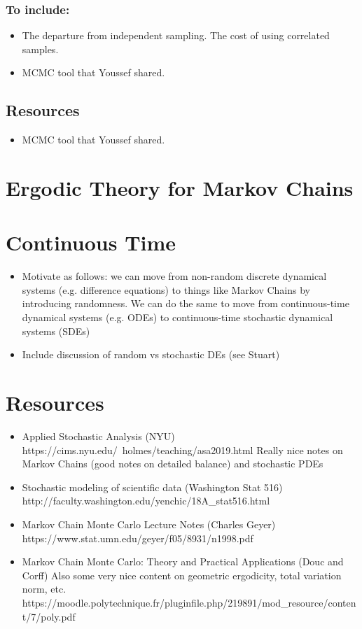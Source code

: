 \documentclass[12pt]{article}
\begin{document}
\subsubsection{To include:}
\begin{itemize}
\item The departure from independent sampling. The cost of using correlated samples. 
\item MCMC tool that Youssef shared. 
\end{itemize}

\subsection{Resources}
\begin{itemize}
\item MCMC tool that Youssef shared. 
\end{itemize}

\section{Ergodic Theory for Markov Chains}


\section{Continuous Time}
\begin{itemize}
\item Motivate as follows: we can move from non-random discrete dynamical systems (e.g. difference equations) to things like Markov Chains by introducing randomness. We can do the 
same to move from continuous-time dynamical systems (e.g. ODEs) to continuous-time stochastic dynamical systems (SDEs) 
\item Include discussion of random vs stochastic DEs (see Stuart)
\end{itemize}

\section{Resources}
\begin{itemize}
\item Applied Stochastic Analysis (NYU)
https://cims.nyu.edu/~holmes/teaching/asa2019.html
Really nice notes on Markov Chains (good notes on detailed balance) and stochastic PDEs
\item Stochastic modeling of scientific data (Washington Stat 516)
http://faculty.washington.edu/yenchic/18A_stat516.html
\item Markov Chain Monte Carlo Lecture Notes (Charles Geyer)
https://www.stat.umn.edu/geyer/f05/8931/n1998.pdf
\item Markov Chain Monte Carlo: Theory and Practical Applications (Douc and Corff)
Also some very nice content on geometric ergodicity, total variation norm, etc.
https://moodle.polytechnique.fr/pluginfile.php/219891/mod_resource/content/7/poly.pdf

\end{itemize}
\end{document}
